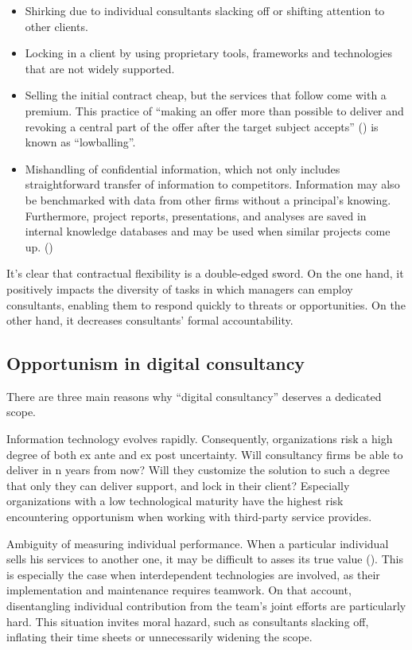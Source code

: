 \documentclass[
  man,floatsintext]{apa6}
\begin{document}
\begin{itemize}
\item
  Shirking due to individual consultants slacking off or shifting attention to other clients.
\item
  Locking in a client by using proprietary tools, frameworks and technologies that are not widely supported.
\item
  Selling the initial contract cheap, but the services that follow come with a premium. This practice of ``making an offer more than possible to deliver and revoking a central part of the offer after the target subject accepts'' () is known as ``lowballing''.
\item
  Mishandling of confidential information, which not only includes straightforward transfer of information to competitors. Information may also be benchmarked with data from other firms without a principal's knowing. Furthermore, project reports, presentations, and analyses are saved in internal knowledge databases and may be used when similar projects come up. ()
\end{itemize}

It's clear that contractual flexibility is a double-edged sword. On the one hand, it positively impacts the diversity of tasks in which managers can employ consultants, enabling them to respond quickly to threats or opportunities. On the other hand, it decreases consultants' formal accountability.

\subsection{Opportunism in digital consultancy}\label{opportunism-in-digital-consultancy}

There are three main reasons why ``digital consultancy'' deserves a dedicated scope.

Information technology evolves rapidly. Consequently, organizations risk a high degree of both ex ante and ex post uncertainty. Will consultancy firms be able to deliver in n years from now? Will they customize the solution to such a degree that only they can deliver support, and lock in their client? Especially organizations with a low technological maturity have the highest risk encountering opportunism when working with third-party service provides.

Ambiguity of measuring individual performance. When a particular individual sells his services to another one, it may be difficult to asses its true value (). This is especially the case when interdependent technologies are involved, as their implementation and maintenance requires teamwork. On that account, disentangling individual contribution from the team's joint efforts are particularly hard. This situation invites moral hazard, such as consultants slacking off, inflating their time sheets or unnecessarily widening the scope.
\end{document}
